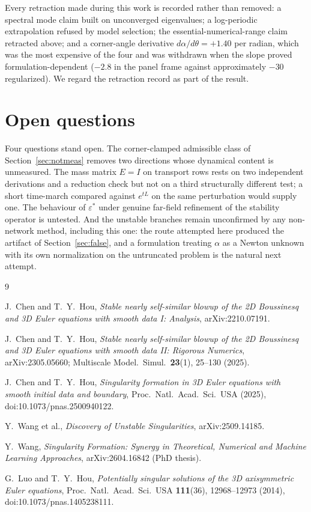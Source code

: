 \documentclass[11pt]{article}
\begin{document}
Every retraction made during this work is recorded rather than removed: a spectral mode
claim built on unconverged eigenvalues; a log-periodic extrapolation refused by model
selection; the essential-numerical-range claim retracted above; and a corner-angle
derivative $d\alpha/d\theta = +1.40$ per radian, which was the most expensive of the four
and was withdrawn when the slope proved formulation-dependent ($-2.8$ in the panel frame
against approximately $-30$ regularized). We regard the retraction record as part of the
result.

\section*{Open questions}

Four questions stand open. The corner-clamped admissible class of
Section~\ref{sec:notmeas} removes two directions whose dynamical content is unmeasured.
The mass matrix $E = I$ on transport rows rests on two independent derivations and a
reduction check but not on a third structurally different test; a short time-march
compared against $e^{tL}$ on the same perturbation would supply one. The behaviour of
$\varepsilon^*$ under genuine far-field refinement of the stability operator is untested.
And the unstable branches remain unconfirmed by any non-network method, including this
one: the route attempted here produced the artifact of Section~\ref{sec:false}, and a
formulation treating $\alpha$ as a Newton unknown with its own normalization on the
untruncated problem is the natural next attempt.

\begin{thebibliography}{9}

J.~Chen and T.~Y.~Hou,
\emph{Stable nearly self-similar blowup of the 2D Boussinesq and 3D Euler equations with
smooth data I: Analysis},
arXiv:2210.07191.

J.~Chen and T.~Y.~Hou,
\emph{Stable nearly self-similar blowup of the 2D Boussinesq and 3D Euler equations with
smooth data II: Rigorous Numerics},
arXiv:2305.05660; Multiscale Model.\ Simul.\ \textbf{23}(1), 25--130 (2025).

J.~Chen and T.~Y.~Hou,
\emph{Singularity formation in 3D Euler equations with smooth initial data and boundary},
Proc.\ Natl.\ Acad.\ Sci.\ USA (2025), doi:10.1073/pnas.2500940122.

Y.~Wang et al.,
\emph{Discovery of Unstable Singularities},
arXiv:2509.14185.

Y.~Wang,
\emph{Singularity Formation: Synergy in Theoretical, Numerical and Machine Learning
Approaches},
arXiv:2604.16842 (PhD thesis).

G.~Luo and T.~Y.~Hou,
\emph{Potentially singular solutions of the 3D axisymmetric Euler equations},
Proc.\ Natl.\ Acad.\ Sci.\ USA \textbf{111}(36), 12968--12973 (2014),
doi:10.1073/pnas.1405238111.

\end{thebibliography}
\end{document}

